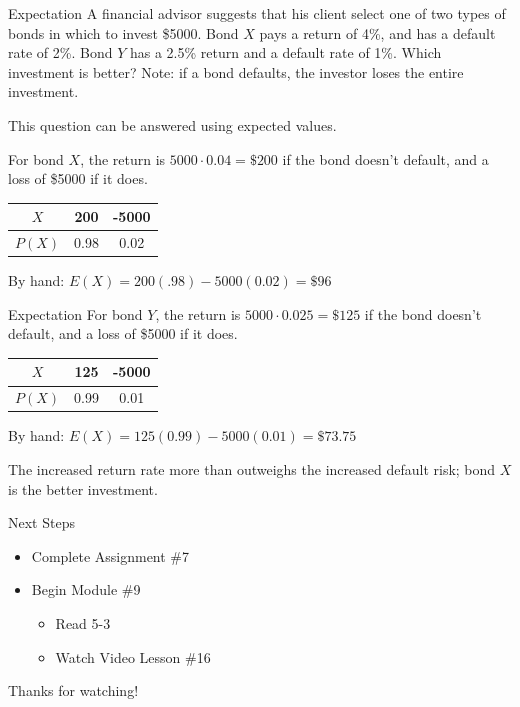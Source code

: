\documentclass[t, aspectratio=169]{beamer}
\newcommand{\?}{\stackrel{?}{=}}
\begin{document}
	\begin{frame}{Expectation}
		A financial advisor suggests that his client select one of two types of bonds in which to invest \$5000. Bond $X$ pays a return of 4\%, and has a default rate of 2\%. Bond $Y$ has a 2.5\% return and a default rate of 1\%. Which investment is better? Note: if a bond defaults, the investor loses the entire investment. \pause
		
		This question can be answered using expected values.
		
		For bond $X$, the return is $5000 \cdot 0.04 = \$200$ if the bond doesn't default, and a loss of \$5000 if it does.
		
		\begin{tabular}{c|cc}
			$X$ & 200 & -5000 \\ \hline
			$P(X)$ & 0.98 & 0.02
		\end{tabular} \pause
	
		By hand: $E(X) = 200(.98) - 5000(0.02) = \$96$
	\end{frame}

	\begin{frame}{Expectation}
		For bond $Y$, the return is $5000 \cdot 0.025 = \$125$ if the bond doesn't default, and a loss of \$5000 if it does.
		
		\begin{tabular}{c|cc}
			$X$ & 125 & -5000 \\ \hline
			$P(X)$ & 0.99 & 0.01
		\end{tabular} \pause
	
		By hand: $E(X) = 125(0.99) - 5000(0.01) = \$73.75$ \pause
		
		The increased return rate more than outweighs the increased default risk; bond $X$ is the better investment.
	\end{frame}

	\begin{frame}{Next Steps}
		\begin{itemize}
			\item Complete Assignment \#7
			\item Begin Module \#9 \begin{itemize}
				\item Read 5-3
				\item Watch Video Lesson \#16
			\end{itemize}
		\end{itemize}
	
		\vfill
		
		Thanks for watching!
	\end{frame}
	
\end{document}
